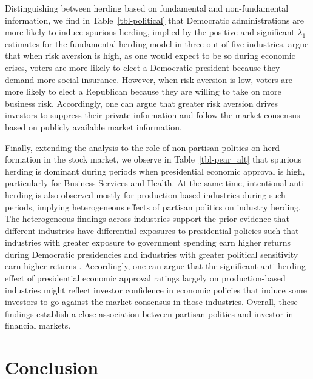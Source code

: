 \documentclass[
  letterpaper,
  DIV=11,
  numbers=noendperiod]{scrartcl}
\begin{document}
Distinguishing between herding based on fundamental and non-fundamental
information, we find in Table~\ref{tbl-political} that Democratic
administrations are more likely to induce spurious herding, implied by
the positive and significant \(\lambda_1\) estimates for the fundamental
herding model in three out of five industries.
\citet{pastor2020political} argue that when risk aversion is high, as
one would expect to be so during economic crises, voters are more likely
to elect a Democratic president because they demand more social
insurance. However, when risk aversion is low, voters are more likely to
elect a Republican because they are willing to take on more business
risk. Accordingly, one can argue that greater risk aversion drives
investors to suppress their private information and follow the market
consensus based on publicly available market information.

Finally, extending the analysis to the role of non-partisan politics on
herd formation in the stock market, we observe in
Table~\ref{tbl-pear_alt} that spurious herding is dominant during
periods when presidential economic approval is high, particularly for
Business Services and Health. At the same time, intentional anti-herding
is also observed mostly for production-based industries during such
periods, implying heterogeneous effects of partisan politics on industry
herding. The heterogeneous findings across industries support the prior
evidence that different industries have differential exposures to
presidential policies such that industries with greater exposure to
government spending earn higher returns during Democratic presidencies
\citep{belo2013government} and industries with greater political
sensitivity earn higher returns \citep{addoum2016political}.
Accordingly, one can argue that the significant anti-herding effect of
presidential economic approval ratings largely on production-based
industries might reflect investor confidence in economic policies that
induce some investors to go against the market consensus in those
industries. Overall, these findings establish a close association
between partisan politics and investor in financial markets.

\section{Conclusion}\label{conclusion}
\end{document}
